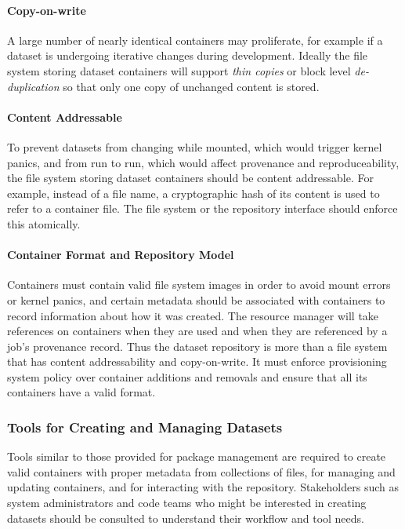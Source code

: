 \paragraph{Copy-on-write}
A large number of nearly identical containers may proliferate, for example
if a dataset is undergoing iterative changes during development.
Ideally the file system storing dataset containers will support
{\em thin copies} or block level {\em de-duplication} so that only one
copy of unchanged content is stored.

\paragraph{Content Addressable}
To prevent datasets from changing while mounted, which would trigger
kernel panics, and from run to run, which would affect provenance and
reproduceability, the file system storing dataset containers should
be content addressable.  For example, instead of a file name, a cryptographic
hash of its content is used to refer to a container file.
The file system or the repository interface should enforce this atomically.

\paragraph{Container Format and Repository Model}
Containers must contain valid file system images in order to avoid
mount errors or kernel panics, and certain metadata should be associated
with containers to record information about how it was created.
The resource manager will take references on containers when they are used
and when they are referenced by a job's provenance record.
Thus the dataset repository is more than a file system that has
content addressability and copy-on-write.
It must enforce provisioning system policy over container additions and
removals and ensure that all its containers have a valid format.

\subsubsection{Tools for Creating and Managing Datasets}

Tools similar to those provided for package management are required to
create valid containers with proper metadata from collections of files,
for managing and updating containers, and for interacting with the repository.
Stakeholders such as system administrators and code teams who might
be interested in creating datasets should be consulted to understand
their workflow and tool needs.  


